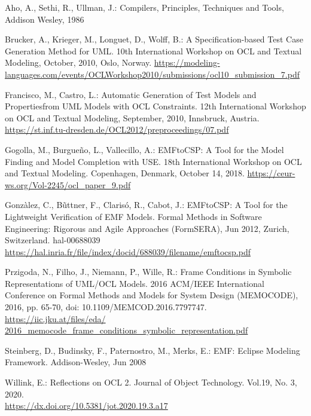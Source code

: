 \documentclass[
]{ceurart}
\begin{document}
%
%
\begin{thebibliography}{}

Aho, A., Sethi, R., Ullman, J.: Compilers, Principles, Techniques and Tools, Addison Wesley, 1986

Brucker, A., Krieger, M., Longuet, D., Wolff, B.: A Specification-based Test Case Generation Method for UML. 10th International Workshop on OCL and Textual Modeling, October, 2010, Oslo, Norway.
\url{https://modeling-languages.com/events/OCLWorkshop2010/submissions/ocl10\_submission\_7.pdf}

Francisco, M., Castro, L.: Automatic Generation of Test Models and Propertiesfrom UML Models with OCL Constraints. 12th International Workshop on OCL and Textual Modeling, September, 2010, Innsbruck, Austria.\\
\url{https://st.inf.tu-dresden.de/OCL2012/preproceedings/07.pdf}

Gogolla, M., Burgue\~no, L., Vallecillo, A.: EMFtoCSP: A Tool for the Model Finding and Model Completion with USE. 18th International Workshop on OCL and Textual Modeling. Copenhagen, Denmark, October 14, 2018.
\url{https://ceur-ws.org/Vol-2245/ocl_paper_9.pdf}

Gonz\`alez, C., B\~uttner, F., Claris\'o, R., Cabot, J.: EMFtoCSP: A Tool for the Lightweight Verification of EMF Models. Formal Methods in Software Engineering: Rigorous and Agile Approaches (FormSERA), Jun 2012, Zurich, Switzerland. hal-00688039
\url{https://hal.inria.fr/file/index/docid/688039/filename/emftocsp.pdf}

Przigoda, N., Filho, J., Niemann, P., Wille, R.: Frame Conditions in Symbolic Representations of UML/OCL Models. 2016 ACM/IEEE International Conference on Formal Methods and Models for System Design (MEMOCODE), 2016, pp. 65-70, doi: 10.1109/MEMCOD.2016.7797747.\\
\url{https://iic.jku.at/files/eda/
2016\_memocode\_frame\_conditions\_symbolic\_representation.pdf}

Steinberg, D., Budinsky, F., Paternostro, M., Merks, E.: EMF: Eclipse Modeling Framework. Addison-Wesley, Jun 2008

Willink, E.: Reflections on OCL 2. Journal of Object Technology. Vol.19, No. 3, 2020.\\ \url{https://dx.doi.org/10.5381/jot.2020.19.3.a17}


\end{thebibliography}
\end{document}
